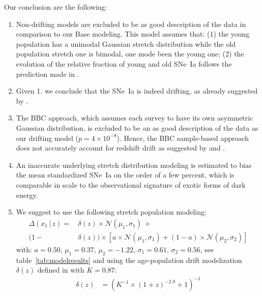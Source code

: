 \documentclass[]{aa} %
\begin{document}
Our conclusion are the following:
\begin{enumerate}

    \item Non-drifting models are excluded to be as good description of the data
        in comparison to our Base modeling.  This model assumes that: (1) the
        young population has a unimodal Gaussian stretch distribution while the
        old population stretch one is bimodal, one mode been the young one; (2)
        the evolution of the relative fraction of young and old SNe~Ia follows
        the prediction made in \cite{rigault2018}. 

    \item Given 1. we conclude that the SNe~Ia is indeed drifting, as already
        suggested by \citep[e.g.][]{howell2007}. 

    \item The BBC approach, which assumes each survey to have its own asymmetric
        Gaussian distribution, is excluded to be an as good description of the
        data as our drifting model ($p=4\times10^{-8}$). Hence, the BBC
        sample-based approach does not accurately account for redshift drift as
        suggested by \cite{scolnic2016} and \cite{scolnic2018a}.

    \item An inaccurate underlying stretch distribution modeling is estimated to
        bias the mean standardized SNe~Ia on the order of a few percent, which
        is comparable in scale to the observational signature of exotic forms of
        dark energy.

    \item We suggest to use the following stretch population modeling:
    \begin{align}
    \label{eqconclusion:stretchz}
        \Delta\left(x_1\,|\,z \right) =
        &\,\delta(z)\times\mathcal{N}(\mu_1,\sigma_1)\,+\nonumber\\
        (1-&\,\delta(z)) \times  \left[a\times\mathcal{N}(\mu_1,\sigma_1) +
        (1-a)\times\mathcal{N}(\mu_2,\sigma_2)\right]\nonumber
    \end{align}
    with: $a=0.50$, $\mu_1=0.37$, $\mu_2=-1.22$, $\sigma_1=0.61$,
    $\sigma_2=0.56$, see table~\ref{tab:modelresults} and using the
    age-population drift modelization $\delta(z)$ defined in \cite{rigault2018}
    with $K=0.87$:
    \begin{align}
        \delta(z) & = \left( K^{-1} \times (1+z)^{-2.8} +1 \right)^{-1}\nonumber
    \end{align}
\end{enumerate}
\end{document}
